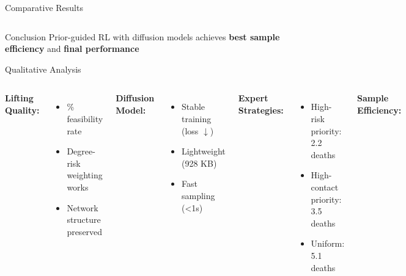 \documentclass[aspectratio=169]{beamer}
\begin{document}
\begin{frame}{Comparative Results}
\begin{columns}
\end{columns}

\vspace{0.5em}
\begin{block}{Conclusion}
Prior-guided RL with diffusion models achieves \textbf{best sample efficiency} and \textbf{final performance}
\end{block}

\end{frame}

\begin{frame}{Qualitative Analysis}

\begin{columns}

\textbf{Lifting Quality:}
\begin{itemize}
    \item {}\% feasibility rate
    \item \checkmark Degree-risk weighting works
    \item \checkmark Network structure preserved
\end{itemize}

\vspace{1em}
\textbf{Diffusion Model:}
\begin{itemize}
    \item \checkmark Stable training (loss $\downarrow$)
    \item \checkmark Lightweight (928 KB)
    \item \checkmark Fast sampling (<1s)
\end{itemize}

\vspace{1em}
\textbf{Expert Strategies:}
\begin{itemize}
    \item High-risk priority: 2.2 deaths
    \item High-contact priority: 3.5 deaths
    \item Uniform: 5.1 deaths
\end{itemize}


\textbf{Sample Efficiency:}



\end{columns}
\end{frame}
\end{document}
